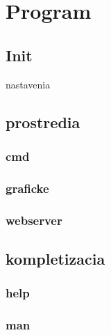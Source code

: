\chapter{Program}
\label{kap:prog}

\section{Init}
nastavenia

\section{prostredia}
\subsection{cmd}
\subsection{graficke}
\subsection{webserver}

\section{kompletizacia}
\subsection{help}
\subsection{man}
